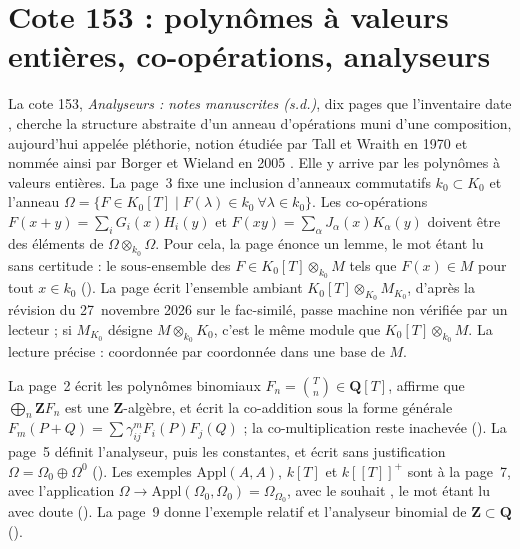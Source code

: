 \section[Cote 153 : polynômes à valeurs entières, co-opérations, analyseurs]{Cote 153 : polynômes à valeurs entières, co-opérations, analyseurs\protect{}}\label{sec:153}

La cote 153, \emph{Analyseurs : notes manuscrites (s.d.)}, dix pages que l'inventaire date \q{[à partir de 1982]}, cherche la structure abstraite d'un anneau d'opérations muni d'une composition, aujourd'hui appelée pléthorie, notion étudiée par Tall et Wraith en 1970 \cite{tallwraith1970} et nommée ainsi par Borger et Wieland en 2005 \cite{borgerwieland2005}. Elle y arrive par les polynômes à valeurs entières. La page~3 fixe une inclusion d'anneaux commutatifs $k_0 \subset K_0$ et l'anneau $\Omega = \{F \in K_0[T] \mid F(\lambda) \in k_0 \ \forall \lambda \in k_0\}$. Les co-opérations $F(x + y) = \sum_i G_i(x) H_i(y)$ et $F(xy) = \sum_\alpha J_\alpha(x) K_\alpha(y)$ doivent être des éléments  de $\Omega \otimes_{k_0} \Omega$. Pour cela, la page énonce un lemme, le mot  étant lu sans certitude : le sous-ensemble des $F \in K_0[T] \otimes_{k_0} M$ tels que $F(x) \in M$ pour tout $x \in k_0$  (). La page écrit l'ensemble ambiant $K_0[T] \otimes_{K_0} M_{K_0}$, d'après la révision du 27~novembre 2026 sur le fac-similé, passe machine non vérifiée par un lecteur ; si $M_{K_0}$ désigne $M \otimes_{k_0} K_0$, c'est le même module que $K_0[T] \otimes_{k_0} M$. La lecture précise : coordonnée par coordonnée dans une base de $M$.

La page~2 écrit les polynômes binomiaux $F_n = \binom{T}{n} \in \mathbf Q[T]$, affirme que $\bigoplus_n \mathbf Z F_n$ est une $\mathbf Z$-algèbre, et écrit la co-addition sous la forme générale $F_m(P + Q) = \sum \gamma^m_{ij} F_i(P) F_j(Q)$ ; la co-multiplication reste inachevée (). La page~5 définit l'analyseur, puis les constantes, et écrit sans justification $\Omega = \Omega_0 \oplus \Omega^0$ (). Les exemples $\mathrm{Appl}(A, A)$, $k[T]$ et $k[[T]]^+$ sont à la page~7, avec l'application $\Omega \to \mathrm{Appl}(\Omega_0, \Omega_0) = \Omega_{\Omega_0}$, avec le souhait , le mot  étant lu avec doute (). La page~9 donne l'exemple relatif et l'analyseur binomial de $\mathbf Z \subset \mathbf Q$ ().

